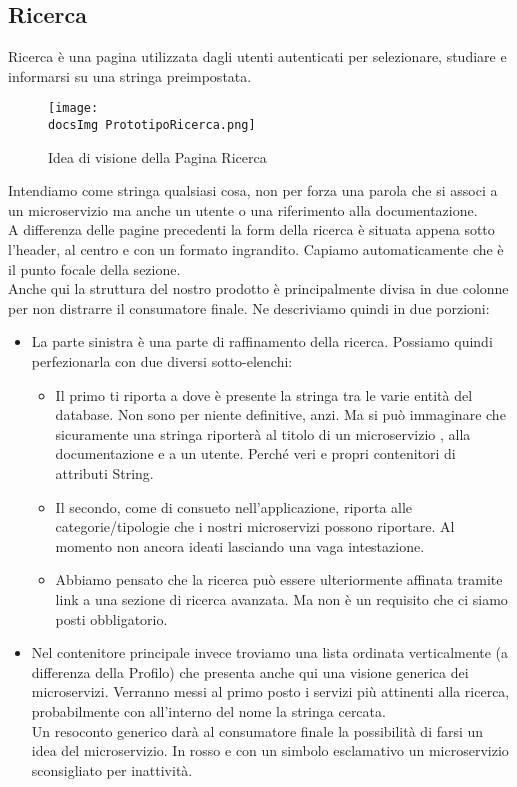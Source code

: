 {	\subsection{Ricerca}{
		Ricerca è una pagina utilizzata dagli utenti autenticati per selezionare, studiare e informarsi su una stringa preimpostata.\\
		\begin{figure}[ht]
			\centering
			\texttt{[image: \\docsImg PrototipoRicerca.png]}
			\caption{Idea di visione della Pagina Ricerca}
			\label{PrototipoRicerca}
		\end{figure}
		Intendiamo come stringa qualsiasi cosa, non per forza una parola che si associ a un microservizio ma anche un utente o una riferimento alla documentazione.\\
		A differenza delle pagine precedenti la form della ricerca è situata appena sotto l'header, al centro e con un formato ingrandito. Capiamo automaticamente che è il punto focale della sezione.\\
		Anche qui la struttura del nostro prodotto è principalmente divisa in due colonne per non distrarre il consumatore finale. Ne descriviamo quindi in due porzioni:
		\begin{itemize}
			\item La parte sinistra è una parte di raffinamento della ricerca. Possiamo quindi perfezionarla con due diversi sotto-elenchi:
			\begin{itemize}
				\item Il primo ti riporta a dove è presente la stringa tra le varie entità del database. Non sono per niente definitive, anzi. Ma si può immaginare che sicuramente una stringa riporterà al titolo di un microservizio , alla documentazione e a un utente. Perché veri e propri contenitori di attributi String.
				\item Il secondo, come di consueto nell'applicazione, riporta alle categorie/tipologie che i nostri microservizi possono riportare. Al momento non ancora ideati lasciando una vaga intestazione.
				\item Abbiamo pensato che la ricerca può essere ulteriormente affinata tramite link a una sezione di ricerca avanzata. Ma non è un requisito che ci siamo posti obbligatorio.
			\end{itemize} 
			\item Nel contenitore principale invece troviamo una lista ordinata verticalmente (a differenza della Profilo) che presenta anche qui una visione generica dei microservizi. Verranno messi al primo posto i servizi più attinenti alla ricerca, probabilmente con all'interno del nome la stringa cercata.\\ 
			Un resoconto generico darà al consumatore finale la possibilità di farsi un idea del microservizio. In rosso e con un simbolo esclamativo un microservizio sconsigliato per inattività.  
		\end{itemize}	
	}		
}
